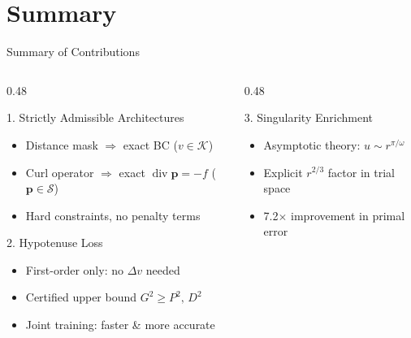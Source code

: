 \documentclass[10pt,aspectratio=169]{beamer}
\DeclareMathOperator{\divg}{div}
\begin{document}
\section{Summary}

\begin{frame}{Summary of Contributions}

  \begin{columns}[T]
    \begin{column}{0.48\textwidth}
      \begin{block}{1. Strictly Admissible Architectures}
        \begin{itemize}
          \item Distance mask $\Rightarrow$ exact BC ($v \in \mathcal{K}$)
          \item Curl operator $\Rightarrow$ exact $\divg\mathbf{p}=-f$
                ($\mathbf{p} \in \mathcal{S}$)
          \item Hard constraints, no penalty terms
        \end{itemize}
      \end{block}
      \medskip
      \begin{block}{2. Hypotenuse Loss}
        \begin{itemize}
          \item First-order only: no $\Delta v$ needed
          \item Certified upper bound $G^2 \ge P^2,\, D^2$
          \item Joint training: faster \& more accurate
        \end{itemize}
      \end{block}
    \end{column}
    \begin{column}{0.48\textwidth}
      \begin{block}{3. Singularity Enrichment}
        \begin{itemize}
          \item Asymptotic theory: $u \sim r^{\pi/\omega}$
          \item Explicit $r^{2/3}$ factor in trial space
          \item 7.2$\times$ improvement in primal error
        \end{itemize}
      \end{block}

\end{column}
\end{columns}
\end{frame}
\end{document}
